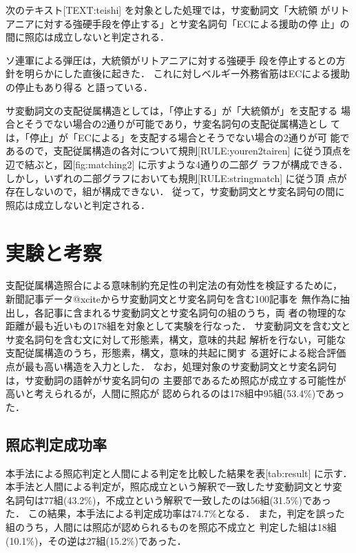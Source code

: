 次のテキスト[TEXT:teishi] を対象とした処理では，サ変動詞文「大統領
がリトアニアに対する強硬手段を停止する」とサ変名詞句「ECによる援助の停
止」の間に照応は成立しないと判定される．
\begin{TEXT}
\text ソ連軍による弾圧は，大統領がリトアニアに対する強硬手
段を停止するとの方針を明らかにした直後に起きた．
これに対しベルギー外務省筋はECによる援助の停止もあり得る
と語っている．
\end{TEXT}
サ変動詞文の支配従属構造としては，「停止する」が「大統領が」を支配する
場合とそうでない場合の2通りが可能であり，サ変名詞句の支配従属構造とし
ては，「停止」が「ECによる」を支配する場合とそうでない場合の2通りが可
能であるので，支配従属構造の各対について規則[RULE:youren2tairen]
に従う頂点を辺で結ぶと，図[fig:matching2] に示すような4通りの二部グ
ラフが構成できる．
しかし，いずれの二部グラフにおいても規則[RULE:stringmatch] に従う頂
点が存在しないので，組が構成できない． 
従って，サ変動詞文とサ変名詞句の間に照応は成立しないと判定される．


\section{実験と考察}


支配従属構造照合による意味制約充足性の判定法の有効性を検証するために，
新聞記事データ@xciteからサ変動詞文とサ変名詞句を含む100記事を
無作為に抽出し，各記事に含まれるサ変動詞文とサ変名詞句の組のうち，両
者の物理的な距離が最も近いもの178組を対象として実験を行なった．
サ変動詞文を含む文とサ変名詞句を含む文に対して形態素，構文，意味的共起
解析を行ない，可能な支配従属構造のうち，形態素，構文，意味的共起に関す
る選好による総合評価点が最も高い構造を入力とした．
なお，処理対象のサ変動詞文とサ変名詞句は，サ変動詞の語幹がサ変名詞句の
主要部であるため照応が成立する可能性が高いと考えられるが，人間に照応が
認められるのは178組中95組(53.4\%)であった．

\subsection{照応判定成功率}

本手法による照応判定と人間による判定を比較した結果を表[tab:result]
に示す．
本手法と人間による判定が，照応成立という解釈で一致したサ変動詞文とサ変
名詞句は77組(43.2\%)，不成立という解釈で一致したのは56組(31.5\%)であっ
た． 
この結果，本手法による判定成功率は74.7\%となる．
また，判定を誤った組のうち，人間には照応が認められるものを照応不成立と
判定した組は18組(10.1\%)，その逆は27組(15.2\%)であった．



